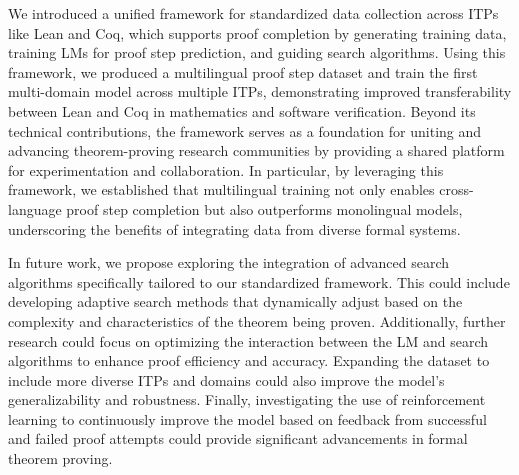  We introduced a unified framework for standardized data collection across ITPs like Lean and Coq, which supports proof completion by generating training data, training LMs for proof step prediction, and guiding search algorithms. Using this framework, we produced a multilingual proof step dataset and train the first multi-domain model across multiple ITPs, demonstrating improved transferability between Lean and Coq in mathematics and software verification. Beyond its technical contributions, the framework serves as a foundation for uniting and advancing theorem-proving research communities by providing a shared platform for experimentation and collaboration. In particular, by leveraging this framework, we established that multilingual training not only enables cross-language proof step completion but also outperforms monolingual models, underscoring the benefits of integrating data from diverse formal systems.
 
In future work, we propose exploring the integration of advanced search algorithms specifically tailored to our standardized framework. This could include developing adaptive search methods that dynamically adjust based on the complexity and characteristics of the theorem being proven. Additionally, further research could focus on optimizing the interaction between the LM and search algorithms to enhance proof efficiency and accuracy. Expanding the dataset to include more diverse ITPs and domains could also improve the model's generalizability and robustness. Finally, investigating the use of reinforcement learning to continuously improve the model based on feedback from successful and failed proof attempts could provide significant advancements in formal theorem proving.